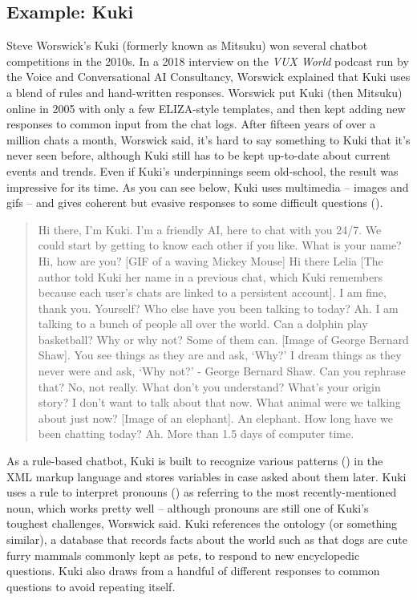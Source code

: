 \subsection{Example: Kuki}

Steve Worswick's  Kuki (formerly known as Mitsuku) won several chatbot competitions in the 2010s.  In a 2018 interview on the \textit{VUX World} podcast run by the Voice and Conversational AI Consultancy, Worswick explained that Kuki uses a blend of rules and  hand-written responses.  Worswick put Kuki (then Mitsuku) online in 2005 with only a few ELIZA-style templates, and then kept adding new responses to common input from the chat logs.  After fifteen years of over a million chats a month, Worswick said, it's hard to say something to Kuki that it's never seen before, although Kuki still has to be kept up-to-date about current events and trends.  Even if Kuki's underpinnings seem old-school, the result was impressive for its time.   As you can see below, Kuki uses multimedia -- images and gifs -- and gives coherent but evasive responses to some difficult questions (). 

 \begin{quote}
 \begin{dialogue}
  Hi there, I'm Kuki.  I'm a friendly AI, here to chat with you 24/7. We could start by getting to know each other if you like. What is your name?
  Hi, how are you?
  [GIF of a waving Mickey Mouse]  Hi there Lelia [The author told Kuki her name in a previous chat, which Kuki remembers because each user's chats are linked to a persistent account]. I am fine, thank you. Yourself?
  Who else have you been talking to today?
  Ah. I am talking to a bunch of people all over the world.
  Can a dolphin play basketball? Why or why not?
  Some of them can. [Image of George Bernard Shaw]. You see things as they are and ask, `Why?' I dream things as they never were and ask, `Why not?' - George Bernard Shaw.
 Can you rephrase that?
 No, not really. What don't you understand?
 What's your origin story?
  I don't want to talk about that now.
 What animal were we talking about just now?
 [Image of an elephant]. An elephant.
 How long have we been chatting today?
 Ah. More than 1.5 days of computer time.
 \end{dialogue}
 \end{quote}

As a rule-based chatbot, Kuki is built to recognize various patterns () in the XML markup language and stores variables in case  asked about them later.  Kuki uses a rule to interpret pronouns () as referring to the most recently-mentioned noun, which works pretty well -- although pronouns are still one of Kuki's toughest challenges, Worswick said.  Kuki references the  ontology (or something similar), a database that records facts about the world such as that dogs are cute furry mammals commonly kept as pets,  to respond to new encyclopedic questions.  Kuki also draws from a handful of different responses to common questions to avoid repeating itself.


